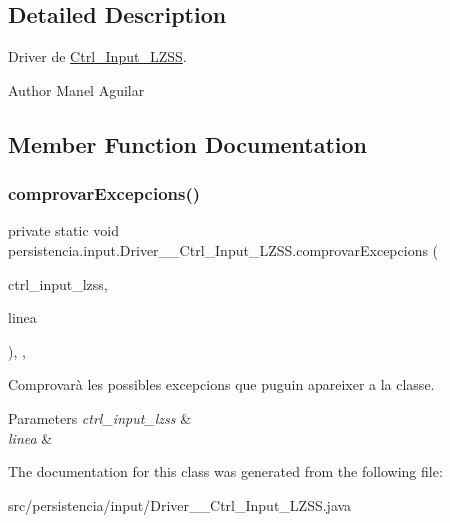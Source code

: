 \subsection{Detailed Description}
Driver de \hyperlink{classpersistencia_1_1input_1_1Ctrl__Input__LZSS}{Ctrl\+\_\+\+Input\+\_\+\+L\+Z\+SS}. 

\begin{DoxyAuthor}{Author}
Manel Aguilar 
\end{DoxyAuthor}


\subsection{Member Function Documentation}
\mbox{\label{classpersistencia_1_1input_1_1Driver____Ctrl__Input__LZSS_a221f978664fc97bdab3b18d3c5f55155}} 
\subsubsection{\texorpdfstring{comprovar\+Excepcions()}{comprovarExcepcions()}}
{\footnotesize\ttfamily private static void persistencia.\+input.\+Driver\+\_\+\+\_\+\+Ctrl\+\_\+\+Input\+\_\+\+L\+Z\+S\+S.\+comprovar\+Excepcions (\begin{DoxyParamCaption}\item[{\hyperlink{classpersistencia_1_1input_1_1Ctrl__Input__LZSS}{Ctrl\+\_\+\+Input\+\_\+\+L\+Z\+SS}}]{ctrl\+\_\+input\+\_\+lzss,  }\item[{String}]{linea }\end{DoxyParamCaption})\hspace{0.3cm}{\ttfamily [inline]}, {\ttfamily [static]}, {\ttfamily [private]}}



Comprovarà les possibles excepcions que puguin apareixer a la classe. 


\begin{DoxyParams}{Parameters}
{\em ctrl\+\_\+input\+\_\+lzss} & \\
\hline
{\em linea} & \\
\hline
\end{DoxyParams}


The documentation for this class was generated from the following file\+:\begin{DoxyCompactItemize}
\item 
src/persistencia/input/Driver\+\_\+\+\_\+\+Ctrl\+\_\+\+Input\+\_\+\+L\+Z\+S\+S.\+java\end{DoxyCompactItemize}
